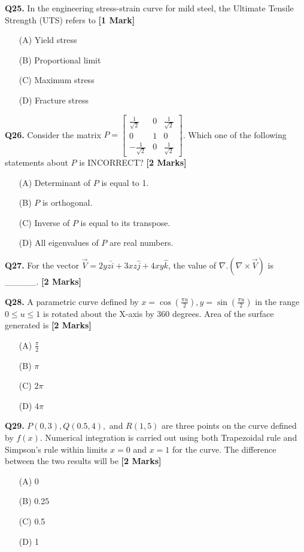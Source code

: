 \documentclass[11pt]{article}
\newcommand{\questiona}[2]{
    \noindent\textbf{Q#2.} #1 \hfill \textbf{[1 Mark]}
}
\newcommand{\questionb}[2]{
    \noindent\textbf{Q#2.} #1 \hfill \textbf{[2 Marks]}
}
\begin{document}
\questiona{In the engineering stress-strain curve for mild steel, the Ultimate Tensile Strength (UTS) refers to}{25}
\begin{enumerate}
    \item[(A)] Yield stress  
    \item[(B)] Proportional limit  
    \item[(C)] Maximum stress  
    \item[(D)] Fracture stress
\end{enumerate}
\vspace{0.5cm}

\questionb{Consider the matrix \( P = \begin{bmatrix} \frac{1}{\sqrt{2}} & 0 & \frac{1}{\sqrt{2}} \\ 0 & 1 & 0 \\ -\frac{1}{\sqrt{2}} & 0 & \frac{1}{\sqrt{2}} \end{bmatrix} \). Which one of the following statements about \( P \) is INCORRECT?}{26}
\begin{enumerate}
    \item[(A)] Determinant of \( P \) is equal to 1.
    \item[(B)] \( P \) is orthogonal.
    \item[(C)] Inverse of \( P \) is equal to its transpose.
    \item[(D)] All eigenvalues of \( P \) are real numbers.
\end{enumerate}
\vspace{0.5cm}

\questionb{For the vector \( \vec{V} = 2yz \hat{i} + 3xz \hat{j} + 4xy \hat{k} \), the value of \( \nabla. (\nabla \times \vec{V}) \) is \_\_\_\_\_.}{27}
\vspace{0.5cm}

\questionb{A parametric curve defined by \( x = \cos \left( \frac{\pi u}{2} \right), y = \sin \left( \frac{\pi u}{2} \right) \) in the range \( 0 \leq u \leq 1 \) is rotated about the X-axis by 360 degrees. Area of the surface generated is}{28}
\begin{enumerate}
    \item[(A)] \( \frac{\pi}{2} \)
    \item[(B)] \( \pi \)
    \item[(C)] \( 2\pi \)
    \item[(D)] \( 4\pi \)
\end{enumerate}
\vspace{0.5cm}

\questionb{\( P (0, 3), Q (0.5, 4), \) and \( R (1, 5) \) are three points on the curve defined by \( f(x) \). Numerical integration is carried out using both Trapezoidal rule and Simpson's rule within limits \( x = 0 \) and \( x = 1 \) for the curve. The difference between the two results will be}{29}
\begin{enumerate}
    \item[(A)] 0
    \item[(B)] 0.25
    \item[(C)] 0.5
    \item[(D)] 1
\end{enumerate}
\vspace{0.5cm}
\end{document}
